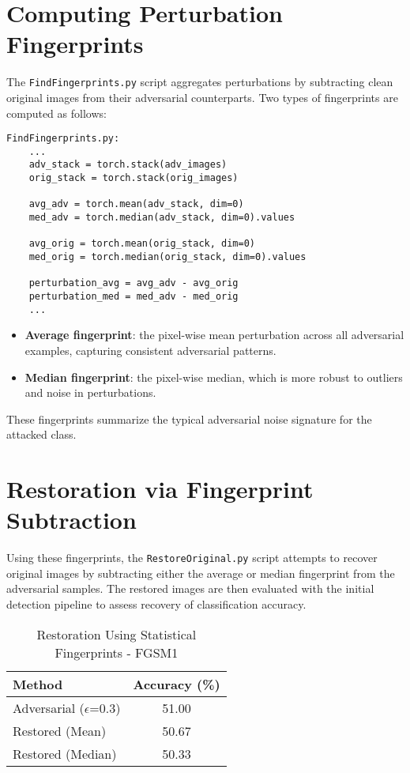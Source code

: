 \documentclass[a4paper,12pt]{report}%
\begin{document}
\section{Computing Perturbation Fingerprints}
The \texttt{FindFingerprints.py} script aggregates perturbations by subtracting clean original images from their adversarial counterparts. Two types of fingerprints are computed as follows:
\begin{verbatim}
FindFingerprints.py:
    ...
    adv_stack = torch.stack(adv_images)
    orig_stack = torch.stack(orig_images)
    
    avg_adv = torch.mean(adv_stack, dim=0)
    med_adv = torch.median(adv_stack, dim=0).values
    
    avg_orig = torch.mean(orig_stack, dim=0)
    med_orig = torch.median(orig_stack, dim=0).values
    
    perturbation_avg = avg_adv - avg_orig
    perturbation_med = med_adv - med_orig
    ...
\end{verbatim}
\begin{itemize}
    \item \textbf{Average fingerprint}: the pixel-wise mean perturbation across all adversarial examples, capturing consistent adversarial patterns.
    \item \textbf{Median fingerprint}: the pixel-wise median, which is more robust to outliers and noise in perturbations.
\end{itemize}

These fingerprints summarize the typical adversarial noise signature for the attacked class.

\newpage
\section{Restoration via Fingerprint Subtraction}
Using these fingerprints, the \texttt{RestoreOriginal.py} script attempts to recover original images by subtracting either the average or median fingerprint from the adversarial samples. The restored images are then evaluated with the initial detection pipeline to assess recovery of classification accuracy.

\begin{table}[H]
\centering
\caption{Restoration Using Statistical Fingerprints - FGSM1}
\begin{tabular}{|l|c|}
\hline
Method & Accuracy (\%) \\
\hline
Adversarial ($\epsilon$=0.3)       & 51.00 \\
Restored (Mean)   & 50.67 \\
Restored (Median) & 50.33 \\
\hline
\end{tabular}
\end{table}
\end{document}
